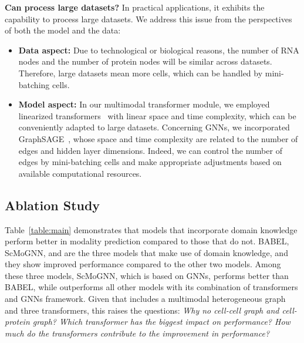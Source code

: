 \noindent \textbf{Can \method{} process large datasets?} In practical applications, it exhibits the capability to process large datasets. We address this issue from the perspectives of both the model and the data:
\begin{itemize}[leftmargin=*]
\item \textbf{Data aspect:} Due to technological or biological reasons, the number of RNA nodes and the number of protein nodes will be similar across datasets. Therefore, large datasets mean more cells, which can be handled by mini-batching cells.
\item \textbf{Model aspect:} In our multimodal transformer module, we employed linearized transformers~\cite{choromanski2021rethinking} with linear space and time complexity, which can be conveniently adapted to large datasets. Concerning GNNs, we incorporated GraphSAGE~\cite{hamilton2017inductive}, whose space and time complexity are related to the number of edges and hidden layer dimensions. Indeed, we can control the number of edges by mini-batching cells and make appropriate adjustments based on available computational resources.
\end{itemize}

\subsection{Ablation Study}
Table~\ref{table:main} demonstrates that models that incorporate domain knowledge perform better in modality prediction compared to those that do not. BABEL, ScMoGNN, and \method{} are the three models that make use of domain knowledge, and they show improved performance compared to the other two models. Among these three models, ScMoGNN, which is based on GNNs, performs better than BABEL, while \method{} outperforms all other models with its combination of transformers and GNNs framework. Given that \method{} includes a multimodal heterogeneous graph and three transformers, this raises the questions: \textit{Why no cell-cell graph and cell-protein graph? Which transformer has the biggest impact on performance? How much do the transformers contribute to the improvement in performance?}

